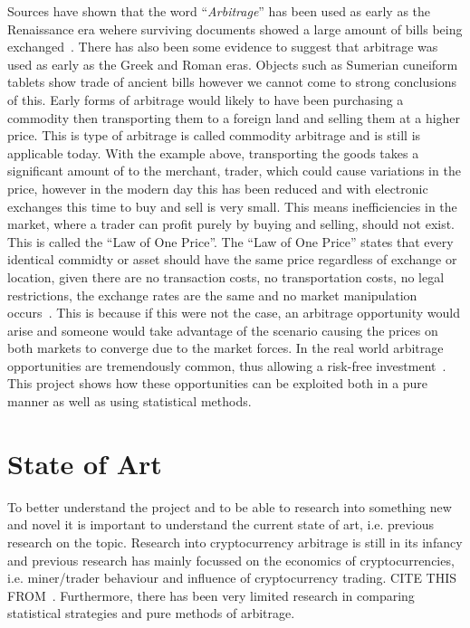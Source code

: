 Sources have shown that the word ``\textit{Arbitrage}'' has been used as early as the Renaissance era wehere surviving documents showed a large amount of bills being exchanged~\cite{poitras_2021}. There has also been some evidence to suggest that arbitrage was used as early as the Greek and Roman eras. Objects such as Sumerian cuneiform tablets show trade of ancient bills however we cannot come to strong conclusions of this. Early forms of arbitrage would likely to have been purchasing a commodity then transporting them to a foreign land and selling them at a higher price. This is type of arbitrage is called commodity arbitrage and is still is applicable today. With the example above, transporting the goods takes a significant amount of to the merchant, trader, which could cause variations in the price, however in the modern day this has been reduced and with electronic exchanges this time to buy and sell is very small. This means inefficiencies in the market, where a trader can profit purely by buying and selling, should not exist. This is called the ``Law of One Price''. The ``Law of One Price'' states that every identical commidty or asset should have the same price regardless of exchange or location, given there are no transaction costs, no transportation costs, no legal restrictions, the exchange rates are the same and no market manipulation occurs~\cite{noauthor_law_nodate}. This is because if this were not the case, an arbitrage opportunity would arise and someone would take advantage of the scenario causing the prices on both markets to converge due to the market forces. In the real world arbitrage opportunities are tremendously common, thus allowing a risk-free investment~\cite{10.2307/1828075, RICHARDSON1978341}. This project shows how these opportunities can be exploited both in a pure manner as well as using statistical methods.

\section{State of Art}
To better understand the project and to be able to research into something new and novel it is important to understand the current state of art, i.e. previous research on the topic. Research into cryptocurrency arbitrage is still in its infancy and previous research has mainly focussed on the economics of cryptocurrencies, i.e. miner/trader behaviour and influence of cryptocurrency trading. CITE THIS FROM~\cite{wang_cyclic_2022}. Furthermore, there has been very limited research in comparing statistical strategies and pure methods of arbitrage.

